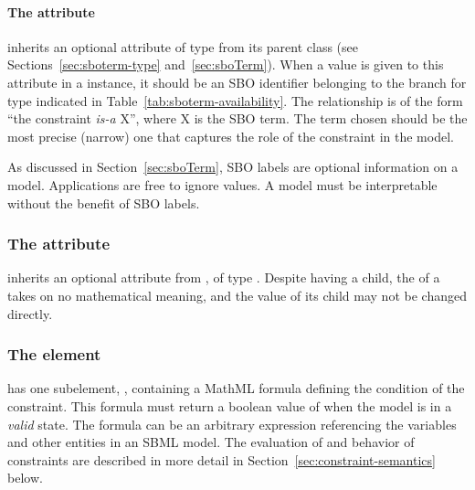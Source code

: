 \paragraph{The  attribute}
\label{sec:constraint-sboterm}

\Constraint inherits an optional 
attribute of type  from its parent
class \SBase (see Sections~\ref{sec:sboterm-type}
and~\ref{sec:sboTerm}).  When a value is given to this
attribute in a  \Constraint instance, it should be an
SBO identifier belonging to the branch for type  \Constraint
indicated in Table~\ref{tab:sboterm-availability}.  The relationship is
of the form ``the constraint \emph{is-a} X'', where X is
the SBO term.  The term chosen should be the most precise (narrow)
one that captures the role of the constraint in the model.

As discussed in Section~\ref{sec:sboTerm}, SBO labels are optional
information on a model.  Applications are free to ignore
 values.  A model must be interpretable without the
benefit of SBO labels.


\begin{blockChanged}
\subsubsection{The  attribute}
\label{sec:constraint-id}

\Constraint inherits an optional  attribute from \SBase, of type .  Despite having a  child, the  of a \Constraint takes on no mathematical meaning, and the value of its  child may not be changed directly.\end{blockChanged}


\subsubsection{The  element}

\Constraint has one  subelement, ,
containing a MathML formula defining the condition of the
constraint.  This formula must return a boolean value of
 when the model is in a \emph{valid} state.  The formula
can be an arbitrary expression referencing the variables and other
entities in an SBML model.  The evaluation of  and
behavior of constraints are described in more detail in
Section~\ref{sec:constraint-semantics} below.


